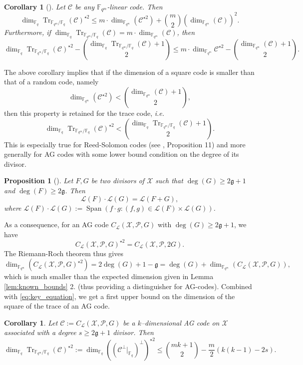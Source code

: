 \documentclass[a4paper]{amsart}
\newtheorem{proposition}[thm]{Proposition}
\newtheorem{coro}[thm]{Corollary}
\theoremstyle{definition}
\theoremstyle{remark}
\newcommand{\calP}{\mathcal{P}}
\newcommand{\calL}{\mathcal{L}}
\newcommand{\calC}{\mathcal{C}}
\newcommand{\calX}{\mathcal{X}}
\newcommand{\fqm}{\mathbb{F}_{q^m}}
\newcommand{\fq}{\mathbb{F}_{q}}
\newcommand{\Tr}[1]{\operatorname{Tr}_{\mathbb{F}_{q^m}/\fq}\left(#1\right)}
\newcommand{\Span}[1]{\operatorname{Span}\left(#1\right)}
\begin{document}
\begin{coro} [{\cite[Corollary~16]{MT21}}]\label{coro:first_bound_square_of_trace}
 Let $\calC$ be any $\fqm$-linear code. Then 
 \begin{equation} \label{eq:mumford_bound}
  \dim_{\fq}\Tr{\calC}^{\star2} \leq m \cdot \dim_{\fqm}(\calC^{\star 2}) + \binom{m}{2} (\dim_{\fqm}(\calC))^2.
 \end{equation}
 Furthermore, if $\dim_{\fq} \Tr{\calC} = m \cdot \dim_{\fqm}(\calC)$, then 
 \[\dim_{\fq} \Tr{\calC}^{\star2} - \binom{\dim_{\fq} \Tr{\calC}+1}{2} \leq m \cdot \dim_{\fqm} \calC^{\star 2} - \binom{\dim_{\fqm} (\calC)+1}{2}.\]
 
 
\end{coro}
The above corollary implies that if the dimension of a square code is smaller than that of a random code, namely
\[ \dim_{\fqm} (\calC^{\star 2}) < \binom{\dim_{\fqm} (\calC)+1}{2},\]
then this property is retained for the trace code, \emph{i.e.}
\[\dim_{\fq} \Tr{\calC}^{\star 2} < \binom{\dim_{\fq} \Tr{\calC}+1}{2}.\]
This is especially true for Reed-Solomon codes (see \cite{MT21}, Proposition 11) and more generally for AG codes with some lower bound condition on the degree of its divisor.


\begin{proposition} [{\cite[Theorem~6]{Mum70}}] \label{prop:mumford_result}
 Let $F,G$ be two divisors of $\calX$ such that $\deg(G) \geq 2\mathfrak{g}+1$ and $\deg(F) \geq 2\mathfrak{g}$. Then
 \[ \calL(F) \cdot \calL(G) = \calL(F+G),\]
 where $\calL(F) \cdot \calL(G) := \Span{ f \cdot g : (f,g) \in \calL(F) \times \calL(G)}$.
\end{proposition}
As a consequence, for an AG code  $C_{\calL}(\calX,\mathcal{P},G)$ with $\deg(G) \geq 2\mathfrak{g}+1$, we have
\[ C_{\calL}(\calX,\mathcal{P},G)^{\star2} = C_{\calL}(\calX,\calP,2G).\]
The Riemann-Roch theorem thus gives
\[ \dim_{\fqm}(C_{\calL}(\calX,\mathcal{P},G)^{\star2}) = 2\deg(G)+1-\mathfrak{g}= \deg(G) + \dim_{\fqm}(C_{\calL}(\calX,\mathcal{P},G)), \]
which is much smaller than the expected dimension given in Lemma \ref{lem:known_bounds} 2. (thus providing a distinguisher for AG-codes). Combined with \eqref{eq:key_equation}, we get a first upper bound on the dimension of the square of the trace of an AG code.

\begin{coro} \label{coro:1st_bound_mumford}
 Let $\mathcal{C} := C_{\calL}(\calX,\mathcal{P},G)$ be a $k$--dimensional AG code on $\calX$ associated with a degree $s \geq 2\mathfrak{g}+1$ divisor. Then
 \[ \dim_{\fq}\Tr{\calC}^{\star2} := \dim_{\fq} \left((\calC^\perp|_{\fq})^{\perp}\right)^{\star2}  \leq \binom{mk+1}{2} - \dfrac{m}{2} (k(k-1)-2s).\]
\end{coro}
\end{document}
